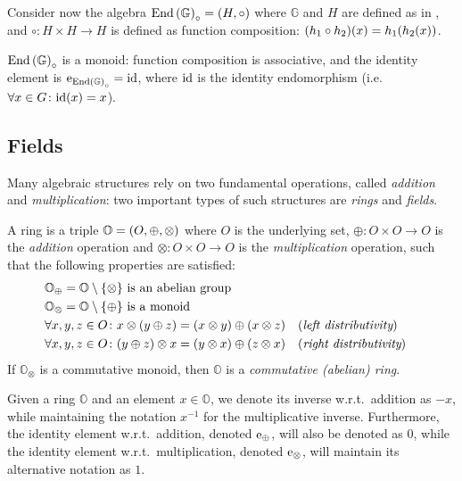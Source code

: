 \begin{example}\label{ex:endo_monoid}
  Consider now the algebra \(\mathrm{End}\left(\mathbb{G}\right)_{\circ} = \left(H, \circ\right)\) 
  where \(\mathbb{G}\) and \(H\) are defined as in , and 
  \(\circ\colon H \times H \to H\) is defined as function composition: 
  \(\call{\Parens*{h_1 \circ h_2}}{x} = \call{h_1}{\call{h_2}{x}}\).
  
  \(\mathrm{End}\left(\mathbb{G}\right)_{\circ}\) is a monoid: function composition is associative, and the 
  identity element is \(\mathrm{e}_{\mathrm{End}\left(\mathbb{G}\right)_{\circ}} = \mathrm{id} \), where \(\mathrm{id} \) is the
  identity endomorphism (i.e.\  \(\forall x \in G\colon \call{\fooid}{x} = x\)). 
\end{example}

\subsection{Fields}
Many algebraic structures rely on two fundamental operations, called \emph{addition} and 
\emph{multiplication}: two important types of such structures are \emph{rings} and \emph{fields}.
\begin{definition}[Ring]
  A ring is a triple \(\mathbb{O} = \left(O, \oplus, \otimes\right)\) where \(O\) is the 
  underlying set, \(\oplus\colon O \times O \to O\) is the \emph{addition} operation and 
  \(\otimes\colon O \times O \to O\) is the \emph{multiplication} operation, such that the 
  following properties are satisfied:
  \begin{align*}
    & \mathbb{O}_{\oplus} = \mathbb{O} \setminus \Set{\otimes}
      \textnormal{ is an abelian group} \\
    & \mathbb{O}_{\otimes} = \mathbb{O} \setminus \Set{\oplus} 
      \textnormal{ is a monoid} \\
    & \forall x,y,z \in O\colon x \otimes \Parens*{y \oplus z} = 
      \Parens*{x \otimes y} \oplus \Parens*{x \otimes z} && (\emph{left distributivity})\\
    & \forall x,y,z \in O\colon \Parens*{y \oplus z} \otimes x = 
      \Parens*{y \otimes x} \oplus \Parens*{z \otimes x} && (\emph{right distributivity})
  \end{align*}
  If \(\mathbb{O}_{\otimes}\) is a commutative monoid, then \(\mathbb{O}\) is a 
  \emph{commutative (abelian) ring}.
\end{definition}

Given a ring \(\mathbb{O}\) and an element \(x \in \mathbb{O}\), 
we denote its inverse w.r.t.\ addition as \(-x\), while maintaining the notation \(x^{-1}\) for 
the multiplicative inverse.
Furthermore, the identity element w.r.t.\ addition, denoted \(\mathrm{e}_{\oplus}\), will also be 
denoted as \(0\), while the identity element w.r.t.\ multiplication, denoted 
\(\mathrm{e}_{\otimes}\), will maintain its alternative notation as \(1\).

